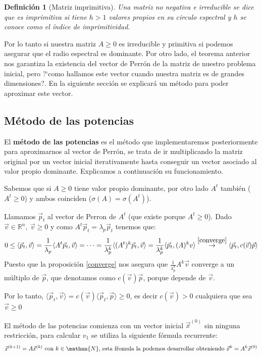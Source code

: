 \documentclass[size=a4, parskip=half, titlepage=false, toc=flat, toc=bib, 12pt]{scrartcl}
\theoremstyle{theorem-style}
\theoremstyle{definition-style}
\newtheorem{ndef}{Definición}[section]
\theoremstyle{remark-style}
\theoremstyle{example-style}
\theoremstyle{definition-style}
\theoremstyle{remark-style}
\begin{document}
\begin{ndef}[Matriz imprimitiva]
Una matriz no negativa e irreducible se dice que es imprimitiva si tiene $h > 1$ valores propios en su circulo espectral y $h$ se conoce como el índice de imprimitividad.
\end{ndef}

Por lo tanto si nuestra matriz $A \geq 0$ es irreducible y primitiva si podemos asegurar que el radio espectral es dominante. Por otro lado, el teorema anterior nos garantiza la existencia del vector de Perrón de la matriz de nuestro problema inicial, pero ?`como hallamos este vector cuando nuestra matriz es de grandes dimensiones?. En la siguiente sección se explicará un método para poder aproximar este vector.

\newpage

\subsection{Método de las potencias}

El \textbf{método de las potencias} es el método que implementaremos posteriormente para aproximarnos al vector de Perrón, se trata de ir multiplicando la matriz original por un vector inicial iterativamente hasta conseguir un vector asociado al valor propio dominante. Explicamos a continuación su funcionamiento.

Sabemos que si $A \geq 0$ tiene valor propio dominante, por otro lado $A^t$ también ($A^t \geq 0$) y
ambos coinciden ($\sigma(A) = \sigma(A^t)$).

Llamamos $\vec{p}_t$ al vector de Perron de $A^t$ (que existe porque $A^t \geq 0$). Dado $\vec{v} \in \mathbb{R}^n , \ \vec{v} \geq 0$ y como $A^t \vec{p}_t = \lambda_p \vec{p}_t $ tenemos que:
$$0 \leq \langle \vec{p}_t, \vec{v} \rangle = \frac{1}{\lambda_p} \langle A^t \vec{p}_t, \vec{v} \rangle = \cdots = \frac{1}{\lambda_p^k} \langle (A^t)^k \vec{p}_t , \vec{v} \rangle =  \frac{1}{\lambda_p^k} \langle \vec{p}_t , (A)^k v \rangle \overset{\ref{converge}} \rightarrow \langle \vec{p}_t , c(\vec{v})\vec{p} \rangle$$
Puesto que la proposición \ref{converge} nos asegura que $\frac{1}{\lambda_p^k} A^k \vec{v}$ converge a un múltiplo de $\vec{p}$, que denotamos como $c(\vec{v})\vec{p}$, porque depende de $\vec{v}$.

Por lo tanto, $\langle \vec{p}_t , \vec{v} \rangle = c(\vec{v}) \langle \vec{p}_t , \vec{p} \rangle \geq 0$, es decir $c(\vec{v}) >0$ cualquiera que sea $\vec{v} \geq 0$

El método de las potencias comienza con un vector inicial $\vec{x}^{(0)}$ sin ninguna restricción, para calcular $v_1$ se utiliza la siguiente fórmula recurrente:
$$\vec{x}^{(k+1)} = A \vec{x}^{(k)} \textrm{ con } k \in \mathnn{N} \textrm{, esta fŕomula la podemos desarrollar obteniendo } \vec{x}^k = A^k \vec{x}^{(0)}$$
\end{document}

